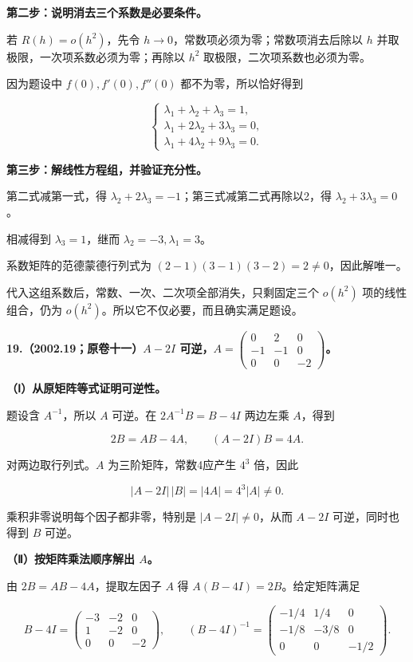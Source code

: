 \documentclass[UTF8,11pt,fontset=windows]{ctexart}
\begin{document}
\textbf{第二步：说明消去三个系数是必要条件。}

若 $R(h)=o(h^2)$，先令 $h\to0$，常数项必须为零；常数项消去后除以 $h$ 并取极限，一次项系数必须为零；再除以 $h^2$ 取极限，二次项系数也必须为零。

因为题设中 $f(0),f'(0),f''(0)$ 都不为零，所以恰好得到

$$
\begin{cases}
\lambda_1+\lambda_2+\lambda_3=1,\\
\lambda_1+2\lambda_2+3\lambda_3=0,\\
\lambda_1+4\lambda_2+9\lambda_3=0.
\end{cases}
$$

\textbf{第三步：解线性方程组，并验证充分性。}

第二式减第一式，得 $\lambda_2+2\lambda_3=-1$；第三式减第二式再除以2，得 $\lambda_2+3\lambda_3=0$。

相减得到 $\lambda_3=1$，继而 $\lambda_2=-3,\lambda_1=3$。

系数矩阵的范德蒙德行列式为 $(2-1)(3-1)(3-2)=2\ne0$，因此解唯一。

代入这组系数后，常数、一次、二次项全部消失，只剩固定三个 $o(h^2)$ 项的线性组合，仍为 $o(h^2)$。所以它不仅必要，而且确实满足题设。

\clearpage

\textbf{19.（2002.19；原卷十一）$A-2I$ 可逆，$A=\begin{pmatrix}0&2&0\\-1&-1&0\\0&0&-2\end{pmatrix}$。}

\textbf{（Ⅰ）从原矩阵等式证明可逆性。}

题设含 $A^{-1}$，所以 $A$ 可逆。在 $2A^{-1}B=B-4I$ 两边左乘 $A$，得到

$$
2B=AB-4A,
\qquad (A-2I)B=4A.
$$

对两边取行列式。$A$ 为三阶矩阵，常数4应产生 $4^3$ 倍，因此

$$
|A-2I|\,|B|=|4A|=4^3|A|\ne0.
$$

乘积非零说明每个因子都非零，特别是 $|A-2I|\ne0$，从而 $A-2I$ 可逆，同时也得到 $B$ 可逆。

\textbf{（Ⅱ）按矩阵乘法顺序解出 $A$。}

由 $2B=AB-4A$，提取左因子 $A$ 得 $A(B-4I)=2B$。给定矩阵满足

$$
B-4I=\begin{pmatrix}-3&-2&0\\1&-2&0\\0&0&-2\end{pmatrix},
\qquad
(B-4I)^{-1}=\begin{pmatrix}-1/4&1/4&0\\-1/8&-3/8&0\\0&0&-1/2\end{pmatrix}.
$$
\end{document}
